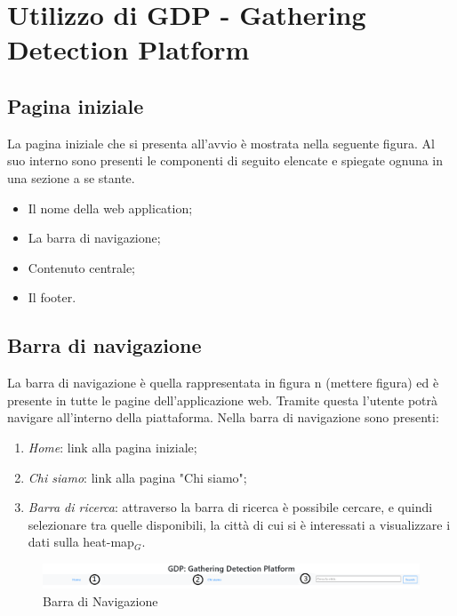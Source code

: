 \chapter{Utilizzo di GDP - Gathering Detection Platform}\label{UtilizzoDiGDPGatheringDetecionPlatform}

\section{Pagina iniziale}\label{UtilizzoDiGDPGatheringDetecionPlatformPaginaIniziale}
La pagina iniziale che si presenta all'avvio è mostrata nella seguente figura.
Al suo interno sono presenti le componenti di seguito elencate e spiegate ognuna in una sezione a se stante.
\begin{itemize}
	\item Il nome della web application;
	\item La barra di navigazione;
	\item Contenuto centrale;
	\item Il footer.
\end{itemize}

\section{Barra di navigazione}\label{UtilizzoDiGDPGatheringDetecionPlatformBarraDiNavigazione}

La barra di navigazione è quella rappresentata in figura n (mettere figura) ed è presente in tutte le pagine dell'applicazione web. Tramite questa l'utente potrà navigare all'interno della piattaforma. Nella barra di navigazione sono presenti:
\begin{enumerate}
	\item \textit{Home}: link alla pagina iniziale;
	\item \textit{Chi siamo}: link alla pagina "Chi siamo";
	\item \textit{Barra di ricerca}: attraverso la barra di ricerca è possibile cercare, e quindi selezionare tra quelle disponibili, la città di cui si è interessati a visualizzare i dati sulla heat-map$_G$. 
\end{enumerate}

\begin{center}
	\begin{figure}
		\includegraphics[width=1\linewidth]{../immagini/manualeUtente/BarraDiNavigazioe.png}
		\caption{Barra di Navigazione}
	\end{figure}
\end{center}

